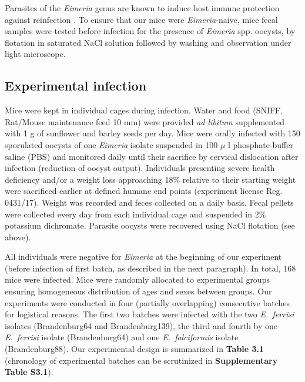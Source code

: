 Parasites of the \textit{Eimeria }genus are known to induce host immune protection against reinfection \citep{rose_immune_1992, smith_genetic_2000}. To ensure that our mice were \textit{Eimeria}-naive, mice fecal samples were tested before infection for the presence of \textit{Eimeria }spp. oocysts, by flotation in saturated NaCl solution followed by washing and observation under light microscope. \par

\subsection{Experimental infection}

Mice were kept in individual cages during infection. Water and food (SNIFF, Rat/Mouse maintenance feed 10 mm) were provided \textit{ad libitum} supplemented with 1 g of sunflower and barley seeds per day. Mice were orally infected with 150 sporulated oocysts of one \textit{Eimeria }isolate suspended in 100 $ \mu $ l phosphate-buffer saline (PBS) and monitored daily until their sacrifice by cervical dislocation after infection (reduction of oocyst output). Individuals presenting severe health deficiency and/or a weight loss approaching 18$\%$  relative to their starting weight were sacrificed earlier at defined humane end points (experiment license Reg. 0431/17). Weight was recorded and feces collected on a daily basis. Fecal pellets were collected every day from each individual cage and suspended in 2$\%$  potassium dichromate. Parasite oocysts were recovered using NaCl flotation (see above). \par

All individuals were negative for \textit{Eimeria }at the beginning of our experiment (before infection of first batch, as described in the next paragraph). In total, 168 mice were infected. Mice were randomly allocated to experimental groups ensuring homogeneous distribution of ages and sexes between groups. Our experiments were conducted in four (partially overlapping) consecutive batches for logistical reasons. The first two batches were infected with the two \textit{E.~ferrisi }isolates (Brandenburg64 and Brandenburg139), the third and fourth by one \textit{E.~ferrisi }isolate (Brandenburg64) and one \textit{E.~falciformis }isolate (Brandenburg88). Our experimental design is summarized in \textbf{Table 3.1} (chronology of experimental batches can be scrutinized in \textbf{Supplementary Table S3.1}). \par

